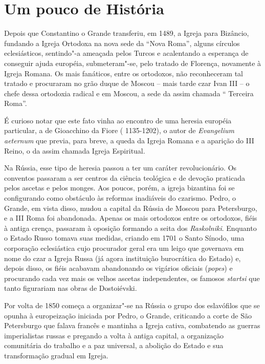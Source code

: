 \section{Um pouco de História}

Depois que Constantino o Grande transferiu, em 1489, a Igreja para
Bizâncio, fundando a Igreja Ortodoxa na nova sede da ``Nova Roma'',
alguns círculos eclesiásticos, sentindo"-a ameaçada pelos Turcos e
acalentando a esperança de conseguir ajuda européia, submeteram"-se, pelo
tratado de Florença, novamente à Igreja Romana. Os mais fanáticos, entre
os ortodoxos, não reconheceram tal tratado e procuraram no grão duque de
Moscou -- mais tarde czar Ivan III -- o chefe dessa ortodoxia radical e
em Moscou, a sede da assim chamada `` Terceira Roma''.

É curioso notar que este fato vinha ao encontro de uma heresia européia
particular, a de Gioacchino da Fiore ( 1135-1202), o autor de
\emph{Evangelium aeternum} que previa, para breve, a queda da Igreja
Romana e a aparição do III Reino, o da assim chamada Igreja Espiritual.

Na Rússia, esse tipo de heresia passou a ter um caráter revolucionário.
Os conventos passaram a ser centros da ciência teológica e de devoção
praticada pelos ascetas e pelos monges. Aos poucos, porém, a igreja
bizantina foi se configurando como obstáculo às reformas inadiáveis do
czarismo. Pedro, o Grande, em vista disso, mudou a capital da Rússia de
Moscou para Petersburgo, e a III Roma foi abandonada. Apenas os mais
ortodoxos entre os ortodoxos, fiéis à antiga crença, passaram à oposição
formando a seita dos \emph{Raskolniki}. Enquanto o Estado Russo tomava
suas medidas, criando em 1701 o Santo Sínodo, uma corporação
eclesiástica cujo procurador geral era um leigo que governava em nome do
czar a Igreja Russa (já agora instituição burocrática do Estado) e,
depois disso, os fiéis acabavam abandonando os vigários oficiais
(\emph{popes}) e procurando cada vez mais os velhos ascetas
independentes, os famosos \emph{startsi} que tanto figurariam nas obras
de Dostoiévski.

Por volta de 1850 começa a organizar"-se na Rússia o grupo dos
eslavófilos que se opunha à europeização iniciada por Pedro, o Grande,
criticando a corte de São Petersburgo que falava francês e mantinha a
Igreja cativa, combatendo as guerras imperialistas russas e pregando a
volta à antiga capital, a organização comunitária do trabalho e a paz
universal, a abolição do Estado e sua transformação gradual em Igreja.

